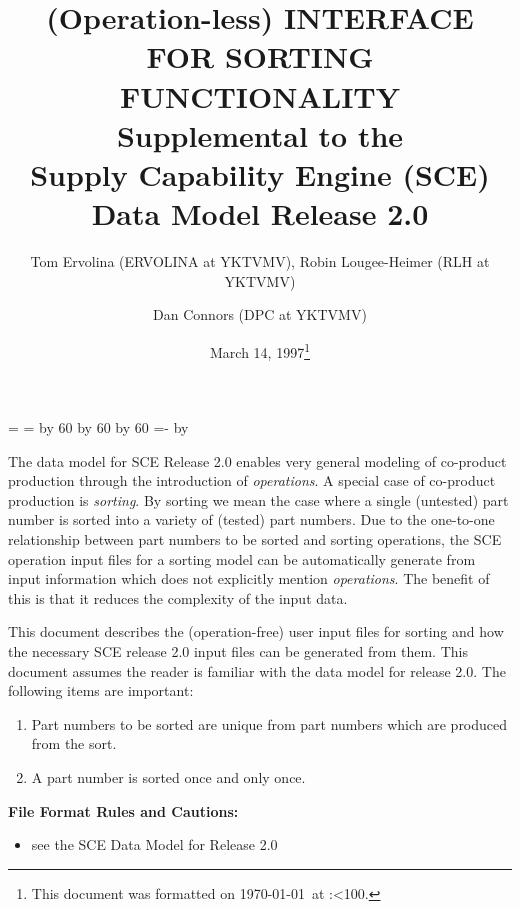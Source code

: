 \topmargin 0.0in
\headheight 0.0in
\headsep 0.0in
\textwidth 7.5in
\oddsidemargin -0.5in
\textheight 9in
\newcount\hh
\newcount\mm

\mm=\time
\hh=\time
\divide\hh by 60
\divide\mm by 60
\multiply\mm by 60
\mm=-\mm
\advance\mm by \time
\def\hhmm{\number\hh:\ifnum\mm<10{}0\fi\number\mm}


\title{(Operation-less) INTERFACE FOR SORTING FUNCTIONALITY \\
       Supplemental to the \\
       Supply Capability Engine (SCE) Data Model Release 2.0}
\author{Tom Ervolina (ERVOLINA at YKTVMV), 
Robin Lougee-Heimer (RLH at YKTVMV) \and Dan Connors  (DPC at YKTVMV)}
\date{March 14, 1997\footnote[2]{This document was 
formatted on \today\ at \hhmm.}}
\maketitle
The data model for SCE Release 2.0 enables very general modeling of
co-product production through the introduction of {\em operations}. A
special case of co-product production is {\em sorting}. By sorting we
mean the case where a single (untested) part number is sorted into a
variety of (tested) part numbers. Due to the one-to-one relationship
between part numbers to be sorted and sorting operations, the SCE
operation input files for a sorting model can be automatically
generate from input information which does not explicitly mention
{\em operations}. The benefit of this is that it reduces the complexity of
the input data.
 
This document describes the (operation-free) user input files for
sorting and how the necessary SCE release 2.0 input files can be
generated from them. This document assumes the reader is familiar with
the data model for release 2.0.  The following items are
important:
\begin{enumerate}

\item Part numbers to be sorted are unique from part numbers
which are produced from the sort.

\item A part number is sorted once and only once.
 
\end{enumerate}

\noindent
{\bf File Format Rules and Cautions:}
\begin{itemize}
\item see the SCE Data Model for Release 2.0
\end{itemize}

